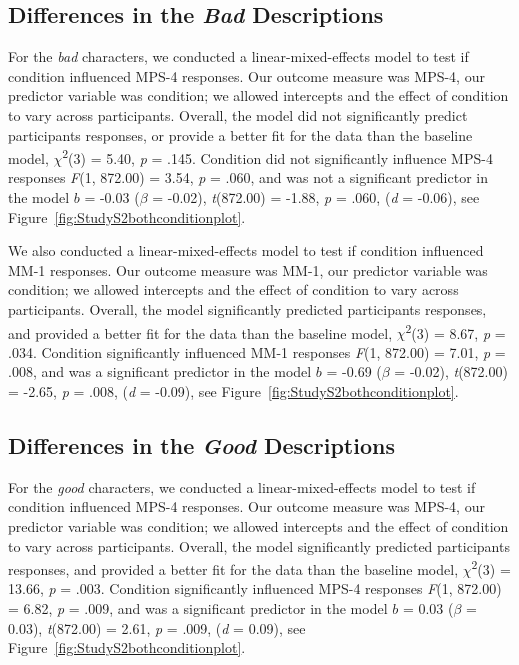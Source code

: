 \documentclass[
  man,floatsintext]{apa6}
\begin{document}
\subsection{\texorpdfstring{Differences in the \emph{Bad} Descriptions}{Differences in the Bad Descriptions}}\label{differences-in-the-bad-descriptions}

For the \emph{bad} characters, we conducted a linear-mixed-effects model to test if condition influenced MPS-4 responses. Our outcome measure was MPS-4, our predictor variable was condition; we allowed intercepts and the effect of condition to vary across participants. Overall, the model did not significantly predict participants responses, or provide a better fit for the data than the baseline model, \(\chi\)\textsuperscript{2}(3) = 5.40, \emph{p} = .145. Condition did not significantly influence MPS-4 responses \emph{F}(1, 872.00) = 3.54, \emph{p} = .060, and was not a significant predictor in the model \(b\) = -0.03 (\(\beta\) = -0.02), \emph{t}(872.00) = -1.88, \emph{p} = .060, (\emph{d} = -0.06), see Figure~\ref{fig:StudyS2bothconditionplot}.

We also conducted a linear-mixed-effects model to test if condition influenced MM-1 responses. Our outcome measure was MM-1, our predictor variable was condition; we allowed intercepts and the effect of condition to vary across participants. Overall, the model significantly predicted participants responses, and provided a better fit for the data than the baseline model, \(\chi\)\textsuperscript{2}(3) = 8.67, \emph{p} = .034. Condition significantly influenced MM-1 responses \emph{F}(1, 872.00) = 7.01, \emph{p} = .008, and was a significant predictor in the model \(b\) = -0.69 (\(\beta\) = -0.02), \emph{t}(872.00) = -2.65, \emph{p} = .008, (\emph{d} = -0.09), see Figure~\ref{fig:StudyS2bothconditionplot}.

\subsection{\texorpdfstring{Differences in the \emph{Good} Descriptions}{Differences in the Good Descriptions}}\label{differences-in-the-good-descriptions}

For the \emph{good} characters, we conducted a linear-mixed-effects model to test if condition influenced MPS-4 responses. Our outcome measure was MPS-4, our predictor variable was condition; we allowed intercepts and the effect of condition to vary across participants. Overall, the model significantly predicted participants responses, and provided a better fit for the data than the baseline model, \(\chi\)\textsuperscript{2}(3) = 13.66, \emph{p} = .003. Condition significantly influenced MPS-4 responses \emph{F}(1, 872.00) = 6.82, \emph{p} = .009, and was a significant predictor in the model \(b\) = 0.03 (\(\beta\) = 0.03), \emph{t}(872.00) = 2.61, \emph{p} = .009, (\emph{d} = 0.09), see Figure~\ref{fig:StudyS2bothconditionplot}.
\end{document}
